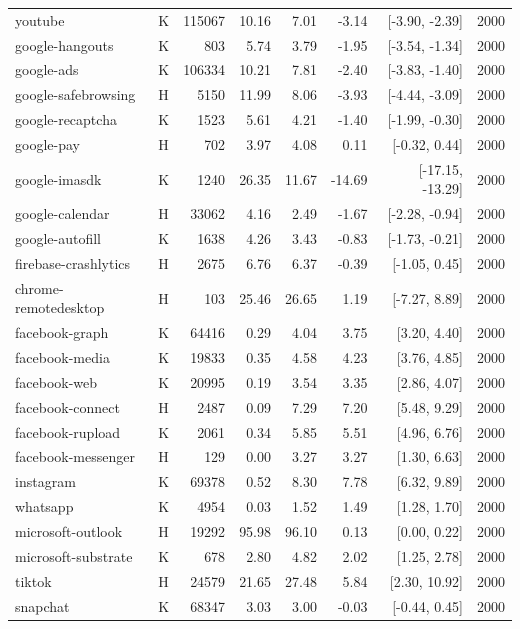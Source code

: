 \begin{longtable}{llrrrrrr}
youtube & K & 115067 & 10.16 & 7.01 & -3.14 & [-3.90, -2.39] & 2000\\
google-hangouts & K & 803 & 5.74 & 3.79 & -1.95 & [-3.54, -1.34] & 2000\\
google-ads & K & 106334 & 10.21 & 7.81 & -2.40 & [-3.83, -1.40] & 2000\\
google-safebrowsing & H & 5150 & 11.99 & 8.06 & -3.93 & [-4.44, -3.09] & 2000\\
google-recaptcha & K & 1523 & 5.61 & 4.21 & -1.40 & [-1.99, -0.30] & 2000\\
google-pay & H & 702 & 3.97 & 4.08 & 0.11 & [-0.32, 0.44] & 2000\\
google-imasdk & K & 1240 & 26.35 & 11.67 & -14.69 & [-17.15, -13.29] & 2000\\
google-calendar & H & 33062 & 4.16 & 2.49 & -1.67 & [-2.28, -0.94] & 2000\\
google-autofill & K & 1638 & 4.26 & 3.43 & -0.83 & [-1.73, -0.21] & 2000\\
firebase-crashlytics & H & 2675 & 6.76 & 6.37 & -0.39 & [-1.05, 0.45] & 2000\\
chrome-remotedesktop & H & 103 & 25.46 & 26.65 & 1.19 & [-7.27, 8.89] & 2000\\
facebook-graph & K & 64416 & 0.29 & 4.04 & 3.75 & [3.20, 4.40] & 2000\\
facebook-media & K & 19833 & 0.35 & 4.58 & 4.23 & [3.76, 4.85] & 2000\\
facebook-web & K & 20995 & 0.19 & 3.54 & 3.35 & [2.86, 4.07] & 2000\\
facebook-connect & H & 2487 & 0.09 & 7.29 & 7.20 & [5.48, 9.29] & 2000\\
facebook-rupload & K & 2061 & 0.34 & 5.85 & 5.51 & [4.96, 6.76] & 2000\\
facebook-messenger & H & 129 & 0.00 & 3.27 & 3.27 & [1.30, 6.63] & 2000\\
instagram & K & 69378 & 0.52 & 8.30 & 7.78 & [6.32, 9.89] & 2000\\
whatsapp & K & 4954 & 0.03 & 1.52 & 1.49 & [1.28, 1.70] & 2000\\
microsoft-outlook & H & 19292 & 95.98 & 96.10 & 0.13 & [0.00, 0.22] & 2000\\
microsoft-substrate & K & 678 & 2.80 & 4.82 & 2.02 & [1.25, 2.78] & 2000\\
tiktok & H & 24579 & 21.65 & 27.48 & 5.84 & [2.30, 10.92] & 2000\\
snapchat & K & 68347 & 3.03 & 3.00 & -0.03 & [-0.44, 0.45] & 2000\\

\end{longtable}
